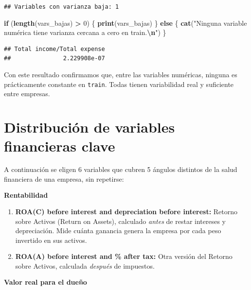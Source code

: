 \documentclass[
]{book}
\newenvironment{Shaded}{\begin{snugshade}}{\end{snugshade}}
\newcommand{\ControlFlowTok}[1]{\textcolor[rgb]{0.13,0.29,0.53}{\textbf{#1}}}
\newcommand{\DecValTok}[1]{\textcolor[rgb]{0.00,0.00,0.81}{#1}}
\newcommand{\FunctionTok}[1]{\textcolor[rgb]{0.13,0.29,0.53}{\textbf{#1}}}
\newcommand{\NormalTok}[1]{#1}
\newcommand{\SpecialCharTok}[1]{\textcolor[rgb]{0.81,0.36,0.00}{\textbf{#1}}}
\newcommand{\StringTok}[1]{\textcolor[rgb]{0.31,0.60,0.02}{#1}}
\providecommand{\tightlist}{%
  \setlength{\itemsep}{0pt}\setlength{\parskip}{0pt}}
\begin{document}
\begin{verbatim}
## Variables con varianza baja: 1
\end{verbatim}

\begin{Shaded}
\begin{Highlighting}[]
\ControlFlowTok{if}\NormalTok{ (}\FunctionTok{length}\NormalTok{(vars\_bajas) }\SpecialCharTok{\textgreater{}} \DecValTok{0}\NormalTok{) \{}
  \FunctionTok{print}\NormalTok{(vars\_bajas)}
\NormalTok{\} }\ControlFlowTok{else}\NormalTok{ \{}
  \FunctionTok{cat}\NormalTok{(}\StringTok{"Ninguna variable numérica tiene varianza cercana a cero en train.}\SpecialCharTok{\textbackslash{}n}\StringTok{"}\NormalTok{)}
\NormalTok{\}}
\end{Highlighting}
\end{Shaded}

\begin{verbatim}
## Total income/Total expense 
##               2.229908e-07
\end{verbatim}

Con este resultado confirmamos que, entre las variables numéricas, ninguna es
prácticamente constante en \texttt{train}. Todas tienen variabilidad real y suficiente entre
empresas.

\section{Distribución de variables financieras clave}\label{distribuciuxf3n-de-variables-financieras-clave}

A continuación se eligen 6 variables que cubren 5 ángulos distintos de la salud
financiera de una empresa, sin repetirse:

\textbf{Rentabilidad}

\begin{enumerate}
\def\labelenumi{\arabic{enumi}.}
\tightlist
\item
  \textbf{ROA(C) before interest and depreciation before interest:} Retorno sobre Activos
  (Return on Assets), calculado \emph{antes} de restar intereses y depreciación. Mide
  cuánta ganancia genera la empresa por cada peso invertido en sus activos.
\item
  \textbf{ROA(A) before interest and \% after tax:} Otra versión del Retorno sobre Activos,
  calculada \emph{después} de impuestos.
\end{enumerate}

\textbf{Valor real para el dueño}
\end{document}
